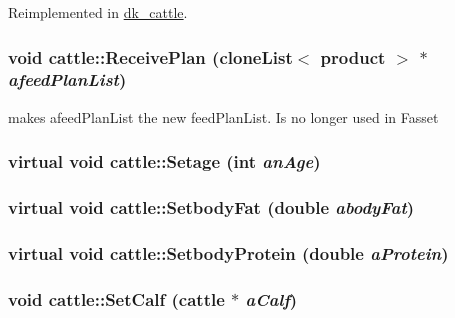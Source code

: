 Reimplemented in \hyperlink{classdk__cattle_a7b51caf022492f303671bc80780bc49c}{dk\_\-cattle}.\hypertarget{classcattle_abbfdc707ceb6778a0e335acdcf8e24d4}{
\subsubsection[{ReceivePlan}]{\setlength{\rightskip}{0pt plus 5cm}void cattle::ReceivePlan ({\bf cloneList}$<$ {\bf product} $>$ $\ast$ {\em afeedPlanList})}}
\label{classcattle_abbfdc707ceb6778a0e335acdcf8e24d4}
makes afeedPlanList the new feedPlanList. Is no longer used in Fasset \hypertarget{classcattle_aa064459116b771e6a3c9b2dac34ce0bf}{
\subsubsection[{Setage}]{\setlength{\rightskip}{0pt plus 5cm}virtual void cattle::Setage (int {\em anAge})}}
\label{classcattle_aa064459116b771e6a3c9b2dac34ce0bf}
\hypertarget{classcattle_a356e6940e7396a01a860fbc853ecc144}{
\subsubsection[{SetbodyFat}]{\setlength{\rightskip}{0pt plus 5cm}virtual void cattle::SetbodyFat (double {\em abodyFat})}}
\label{classcattle_a356e6940e7396a01a860fbc853ecc144}
\hypertarget{classcattle_ad9f7a3fc99cb90f4634ea36a8af5b15d}{
\subsubsection[{SetbodyProtein}]{\setlength{\rightskip}{0pt plus 5cm}virtual void cattle::SetbodyProtein (double {\em aProtein})}}
\label{classcattle_ad9f7a3fc99cb90f4634ea36a8af5b15d}
\hypertarget{classcattle_a41da605e6ff1f29060cd6b67899946f1}{
\subsubsection[{SetCalf}]{\setlength{\rightskip}{0pt plus 5cm}void cattle::SetCalf ({\bf cattle} $\ast$ {\em aCalf})}}
